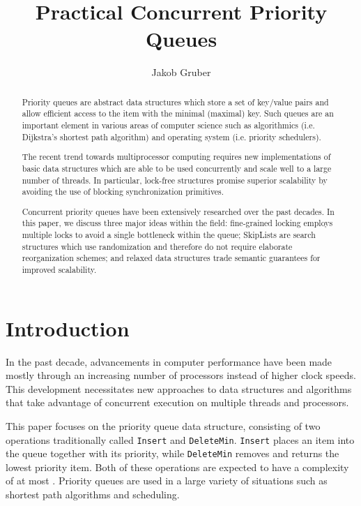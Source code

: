 \documentclass[a4paper,10pt]{article}
\title{Practical Concurrent Priority Queues}
\author{Jakob Gruber}
\begin{document}
\maketitle

\begin{abstract}
Priority queues are abstract data structures which store a set of key/value pairs
and allow efficient access to the item with the minimal (maximal) key. Such queues are an important
element in various areas of computer science such as algorithmics (i.e. Dijkstra's shortest
path algorithm) and operating system (i.e. priority schedulers).

The recent trend towards multiprocessor computing requires new implementations of basic
data structures which are able to be used concurrently and scale well to a large number
of threads. In particular, lock-free structures promise superior scalability by avoiding
the use of blocking synchronization primitives.

Concurrent priority queues have been extensively researched over the past decades.
In this paper, we discuss three major ideas within the field: fine-grained locking
employs multiple locks to avoid a single bottleneck within the queue; SkipLists
are search structures which use randomization and therefore do not require elaborate reorganization
schemes; and relaxed data structures trade semantic guarantees for improved scalability.
\end{abstract}

\section{Introduction}



In the past decade, advancements in computer performance have been made mostly
through an increasing number of processors instead of higher clock speeds.
This development necessitates new approaches to data structures and algorithms
that take advantage of concurrent execution on multiple threads and processors.



This paper focuses on the priority queue data structure, consisting of two operations
traditionally called \lstinline|Insert| and \lstinline|DeleteMin|. \lstinline|Insert|
places an item into the queue together with its priority, while \lstinline|DeleteMin|
removes and returns the lowest priority item. Both of these operations are expected to have
a complexity of at most . Priority queues are used in a large variety
of situations such as shortest path algorithms and scheduling. 
\end{document}

